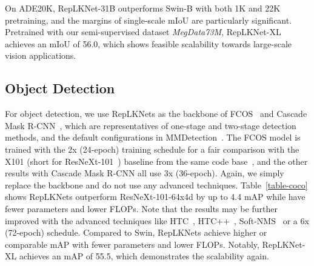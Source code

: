 \documentclass[10pt,twocolumn,letterpaper]{article}
\begin{document}
	On ADE20K, RepLKNet-31B outperforms Swin-B with both 1K and 22K pretraining, and the margins of single-scale mIoU are particularly significant. Pretrained with our semi-supervised dataset \emph{MegData73M}, RepLKNet-XL achieves an mIoU of 56.0, which shows feasible scalability towards large-scale vision applications.

	
	\subsection{Object Detection}
	
	For object detection, we use RepLKNets as the backbone of FCOS~\cite{fcos} and Cascade Mask R-CNN~\cite{he2017mask,cai2019cascade}, which are representatives of one-stage and two-stage detection methods, and the default configurations in MMDetection~\cite{mmdetection}. The FCOS model is trained with the 2x (24-epoch) training schedule for a fair comparison with the X101 (short for ResNeXt-101~\cite{xie2017aggregated}) baseline from the same code base~\cite{mmseg2020}, and the other results with Cascade Mask R-CNN all use 3x (36-epoch). Again, we simply replace the backbone and do not use any advanced techniques. Table~\ref{table-coco} shows RepLKNets outperform ResNeXt-101-64x4d by up to 4.4 mAP while have fewer parameters and lower FLOPs. Note that the results may be further improved with the advanced techniques like HTC~\cite{chen2019hybrid}, HTC++~\cite{swin}, Soft-NMS~\cite{bodla2017soft} or a 6x (72-epoch) schedule. Compared to Swin, RepLKNets achieve higher or comparable mAP with fewer parameters and lower FLOPs. Notably, RepLKNet-XL achieves an mAP of 55.5, which demonstrates the scalability again.
	
\end{document}

